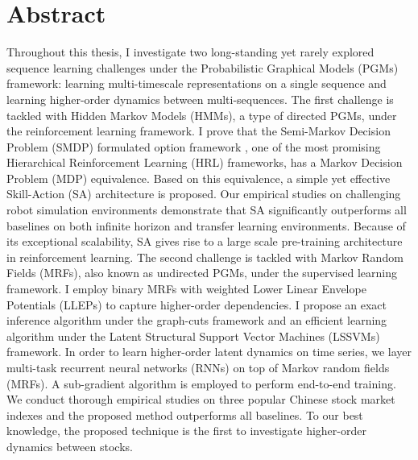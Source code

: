 
\chapter*{Abstract}
\label{cha:abstract}

Throughout this thesis, I investigate two long-standing yet
rarely explored sequence learning challenges under the
Probabilistic Graphical Models (PGMs) framework: learning
multi-timescale representations on a single sequence and learning
higher-order dynamics between multi-sequences. The first
challenge is tackled with Hidden Markov Models (HMMs), a type of
directed PGMs, under the reinforcement learning framework. I
prove that the Semi-Markov Decision Problem (SMDP) formulated
option framework
\cite{sutton1999between,bacon2017option,zhang2019dac}, one of the
most promising Hierarchical Reinforcement Learning (HRL)
frameworks, has a Markov Decision Problem (MDP) equivalence.
Based on this equivalence, a simple yet effective Skill-Action
(SA) architecture is proposed. Our empirical studies on
challenging robot simulation environments demonstrate that SA
significantly outperforms all baselines on both infinite horizon
and transfer learning environments. Because of its exceptional
scalability, SA gives rise to a large scale pre-training
architecture in reinforcement learning. The second challenge is
tackled with Markov Random Fields (MRFs), also known as
undirected PGMs, under the supervised learning framework. I
employ binary MRFs with weighted Lower Linear Envelope Potentials
(LLEPs) to capture higher-order dependencies. I propose an exact
inference algorithm under the graph-cuts framework and an
efficient learning algorithm under the Latent Structural Support
Vector Machines (LSSVMs) framework. In order to learn
higher-order latent dynamics on time series, we layer multi-task
recurrent neural networks (RNNs) on top of Markov random fields
(MRFs). A sub-gradient algorithm is employed to perform
end-to-end training. We conduct thorough empirical studies on
three popular Chinese stock market indexes and the proposed
method outperforms all baselines. To our best knowledge, the
proposed technique is the first to investigate higher-order
dynamics between stocks.

